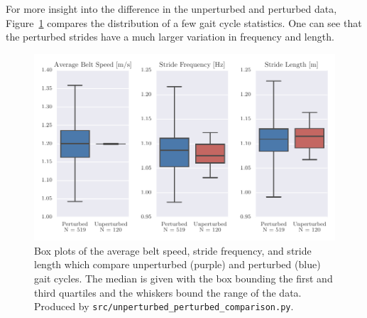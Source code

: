 \documentclass[fleqn,12pt]{wlpeerj}
\begin{document}
For more insight into the difference in the unperturbed and perturbed data,
Figure~\ref{fig:gait-cycle-stats-comparison} compares the distribution of a few
gait cycle statistics. One can see that the perturbed strides have a much
larger variation in frequency and length.
%
\begin{figure}
  \centering
  \includegraphics{figures/unperturbed-perturbed-boxplot-comparison.pdf}
  \cprotect\caption{Box plots of the average belt speed, stride frequency, and
    stride length which compare unperturbed (purple) and perturbed (blue) gait
    cycles. The median is given with the box bounding the first and third
    quartiles and the whiskers bound the range of the data. Produced by
    \verb|src/unperturbed_perturbed_comparison.py|.}
  \label{fig:gait-cycle-stats-comparison}
\end{figure}
\end{document}
